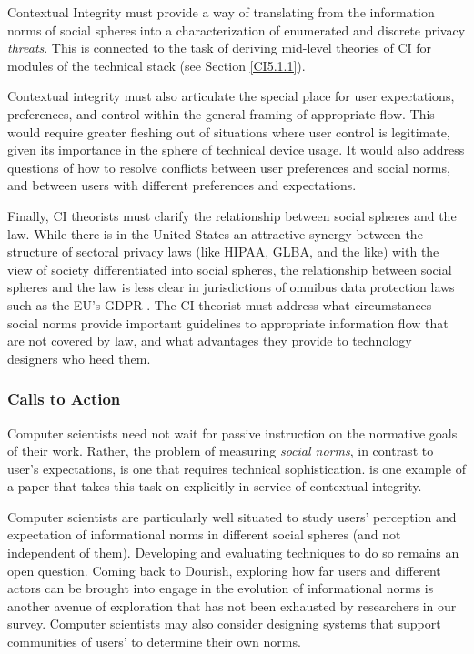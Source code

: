 \documentclass[../thesis.tex]{subfiles}
\begin{document}
Contextual Integrity must provide a way of translating from the
information norms of social spheres into a characterization of
enumerated and discrete privacy \textit{threats}. This is connected to
the task of deriving mid-level theories of CI for modules of the
technical stack (see Section \ref{CI5.1.1}).

Contextual integrity must also articulate the special place for user
expectations, preferences, and control within the general framing of
appropriate flow. This would require greater fleshing out of situations
where user control is legitimate, given its importance in the sphere of
technical device usage. It would also address questions of how to
resolve conflicts between user preferences and social norms, and
between users with different preferences and expectations.

Finally, CI theorists must clarify the relationship between social
spheres and the law. While there is in the United States an attractive
synergy between the structure of sectoral privacy laws (like HIPAA,
GLBA, and the like) with the view of society differentiated into social
spheres, the relationship between social spheres and the law is less
clear in jurisdictions of omnibus data protection laws such as the
EU's GDPR \cite{regulation2016regulation}.
The CI theorist must
address what circumstances social norms provide important guidelines to
appropriate information flow that are not covered by law, and what
advantages they provide to technology designers who heed them.

\subsubsection{Calls to Action}
\label{CI5.3.2}

Computer scientists need not wait for passive instruction on the
normative goals of their work. Rather, the problem of measuring
\textit{social norms}, in contrast to user's
expectations, is one that requires technical sophistication.
\citet{shvartzshnaider2016learning} is one example of a paper that takes this
task on explicitly in service of contextual integrity.

Computer scientists are particularly well situated to study
users' perception and expectation of informational
norms in different social spheres (and not independent of them).
Developing and evaluating techniques to do so remains an open question.
Coming back to Dourish, exploring how far users and different actors
can be brought into engage in the evolution of informational norms is
another avenue of exploration that has not been exhausted by
researchers in our survey. Computer scientists may also consider
designing systems that support communities of users' to
determine their own norms.
\end{document}
